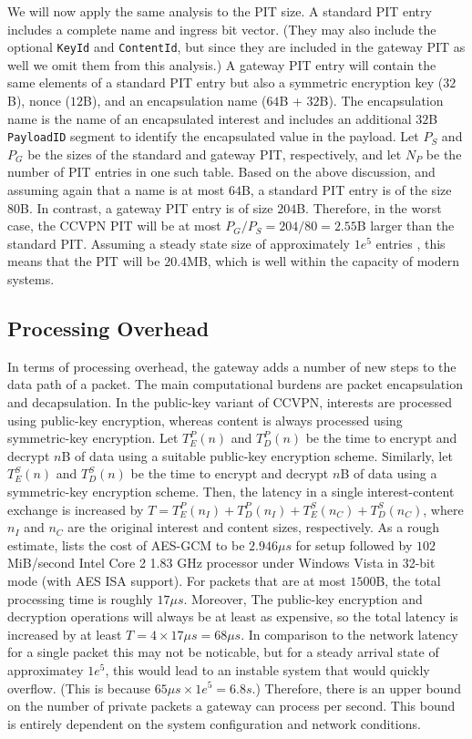 We will now apply the same analysis to the PIT size. A standard PIT entry includes a
complete name and ingress bit vector. (They may also include the optional {\tt KeyId}
and {\tt ContentId}, but since they are included in the gateway PIT as well we omit them
from this analysis.) A gateway PIT entry will contain the same elements of a standard
PIT entry but also a symmetric encryption key ($32$B), nonce ($12$B), and an
encapsulation name ($64$B + $32$B).
The encapsulation name is the name of an encapsulated interest and includes an additional
$32$B {\tt PayloadID} segment to identify the encapsulated value in the payload. Let
$P_S$ and $P_G$ be the sizes of the standard and gateway PIT, respectively, and let $N_P$
be the number of PIT entries in one such table. Based on the above discussion, and assuming
again that a name is at most $64$B, a standard PIT entry is of the size $80$B. In contrast,
a gateway PIT entry is of size $204$B. Therefore, in the worst case, the CCVPN PIT
will be at most $P_G / P_S = 204/80 = 2.55$B larger than the standard PIT. Assuming
a steady state size of approximately $1e^5$ entries \cite{carofiglio2015pending},
this means that the PIT will be $20.4$MB, which is well within the capacity of
modern systems.

\subsection{Processing Overhead}
In terms of processing overhead, the gateway adds a number of new steps to the data
path of a packet. The main computational burdens are packet encapsulation and decapsulation.
In the public-key variant of CCVPN, interests are processed using public-key encryption,
whereas content is always processed using symmetric-key encryption. Let $T_E^P(n)$ and $T_D^P(n)$
be the time to encrypt and decrypt $n$B of data using a suitable public-key encryption scheme.
Similarly, let $T_E^S(n)$ and $T_D^S(n)$ be the time to encrypt and decrypt $n$B of data
using a symmetric-key encryption scheme. Then, the latency in a single interest-content
exchange is increased by $T = T_E^P(n_I) + T_D^P(n_I) + T_E^S(n_C) + T_D^S(n_C)$, where
$n_I$ and $n_C$ are the original interest and content sizes, respectively. As a rough
estimate, \cite{benchmarks} lists the cost of AES-GCM to be $2.946\mu s$ for setup
followed by $102$MiB/second Intel Core 2 1.83 GHz processor under Windows Vista in
32-bit mode (with AES ISA support). For packets that are at most $1500$B,
the total processing time is roughly $17\mu s$. Moreover, The public-key encryption and
decryption operations will always be at least as expensive, so the total latency is
increased by at least $T = 4 \times 17\mu s = 68 \mu s$. In comparison to the network
latency for a single packet this may not be noticable, but for a steady arrival state of
approximatey $1e^5$, this would lead to an instable system that would quickly overflow.
(This is because $65 \mu s \times 1e^5 = 6.8s$.) Therefore, there is an upper bound on
the number of private packets a gateway can process per second. This bound is entirely
dependent on the system configuration and network conditions.

